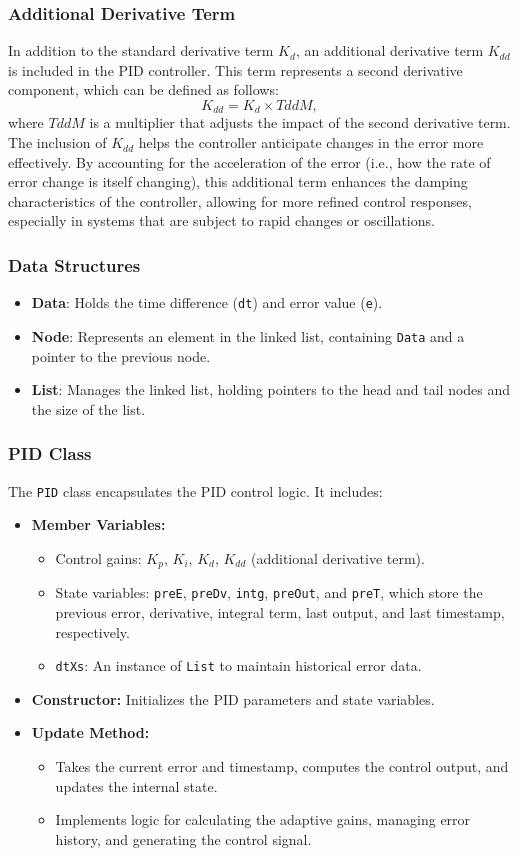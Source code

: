 \documentclass[a4paper,12pt]{article}
\begin{document}
\subsubsection{Additional Derivative Term}
In addition to the standard derivative term $K_d$, an additional derivative term $K_{dd}$ is included in the PID controller. This term represents a second derivative component, which can be defined as follows:
$$
K_{dd} = K_d \times TddM,
$$
where $TddM$ is a multiplier that adjusts the impact of the second derivative term. \\
The inclusion of $K_{dd}$ helps the controller anticipate changes in the error more effectively. By accounting for the acceleration of the error (i.e., how the rate of error change is itself changing), this additional term enhances the damping characteristics of the controller, allowing for more refined control responses, especially in systems that are subject to rapid changes or oscillations.
\subsubsection{Data Structures}
\begin{itemize}
\item \textbf{Data}: Holds the time difference (\texttt{dt}) and error value (\texttt{e}).
\item \textbf{Node}: Represents an element in the linked list, containing \texttt{Data} and a pointer to the previous node.
\item \textbf{List}: Manages the linked list, holding pointers to the head and tail nodes and the size of the list.
\end{itemize}
\subsubsection{PID Class}
The \texttt{PID} class encapsulates the PID control logic. It includes:
\begin{itemize}
\item \textbf{Member Variables:}
\begin{itemize}
\item Control gains: $K_p$, $K_i$, $K_d$, $K_{dd}$ (additional derivative term).
\item State variables: \texttt{preE}, \texttt{preDv}, \texttt{intg}, \texttt{preOut}, and \texttt{preT}, which store the previous error, derivative, integral term, last output, and last timestamp, respectively.
\item \texttt{dtXs}: An instance of \texttt{List} to maintain historical error data.
\end{itemize}
\item \textbf{Constructor:} Initializes the PID parameters and state variables.
\item \textbf{Update Method:}
\begin{itemize}
\item Takes the current error and timestamp, computes the control output, and updates the internal state.
\item Implements logic for calculating the adaptive gains, managing error history, and generating the control signal.
\end{itemize}
\end{itemize}
\end{document}
